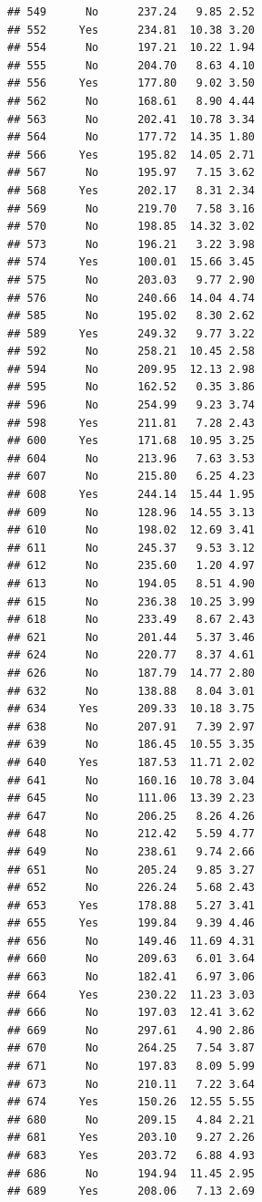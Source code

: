 \documentclass[
]{article}
\begin{document}
\begin{verbatim}
## 549      No      237.24   9.85 2.52
## 552     Yes      234.81  10.38 3.20
## 554      No      197.21  10.22 1.94
## 555      No      204.70   8.63 4.10
## 556     Yes      177.80   9.02 3.50
## 562      No      168.61   8.90 4.44
## 563      No      202.41  10.78 3.34
## 564      No      177.72  14.35 1.80
## 566     Yes      195.82  14.05 2.71
## 567      No      195.97   7.15 3.62
## 568     Yes      202.17   8.31 2.34
## 569      No      219.70   7.58 3.16
## 570      No      198.85  14.32 3.02
## 573      No      196.21   3.22 3.98
## 574     Yes      100.01  15.66 3.45
## 575      No      203.03   9.77 2.90
## 576      No      240.66  14.04 4.74
## 585      No      195.02   8.30 2.62
## 589     Yes      249.32   9.77 3.22
## 592      No      258.21  10.45 2.58
## 594      No      209.95  12.13 2.98
## 595      No      162.52   0.35 3.86
## 596      No      254.99   9.23 3.74
## 598     Yes      211.81   7.28 2.43
## 600     Yes      171.68  10.95 3.25
## 604      No      213.96   7.63 3.53
## 607      No      215.80   6.25 4.23
## 608     Yes      244.14  15.44 1.95
## 609      No      128.96  14.55 3.13
## 610      No      198.02  12.69 3.41
## 611      No      245.37   9.53 3.12
## 612      No      235.60   1.20 4.97
## 613      No      194.05   8.51 4.90
## 615      No      236.38  10.25 3.99
## 618      No      233.49   8.67 2.43
## 621      No      201.44   5.37 3.46
## 624      No      220.77   8.37 4.61
## 626      No      187.79  14.77 2.80
## 632      No      138.88   8.04 3.01
## 634     Yes      209.33  10.18 3.75
## 638      No      207.91   7.39 2.97
## 639      No      186.45  10.55 3.35
## 640     Yes      187.53  11.71 2.02
## 641      No      160.16  10.78 3.04
## 645      No      111.06  13.39 2.23
## 647      No      206.25   8.26 4.26
## 648      No      212.42   5.59 4.77
## 649      No      238.61   9.74 2.66
## 651      No      205.24   9.85 3.27
## 652      No      226.24   5.68 2.43
## 653     Yes      178.88   5.27 3.41
## 655     Yes      199.84   9.39 4.46
## 656      No      149.46  11.69 4.31
## 660      No      209.63   6.01 3.64
## 663      No      182.41   6.97 3.06
## 664     Yes      230.22  11.23 3.03
## 666      No      197.03  12.41 3.62
## 669      No      297.61   4.90 2.86
## 670      No      264.25   7.54 3.87
## 671      No      197.83   8.09 5.99
## 673      No      210.11   7.22 3.64
## 674     Yes      150.26  12.55 5.55
## 680      No      209.15   4.84 2.21
## 681     Yes      203.10   9.27 2.26
## 683     Yes      203.72   6.88 4.93
## 686      No      194.94  11.45 2.95
## 689     Yes      208.06   7.13 2.69

\end{verbatim}
\end{document}
